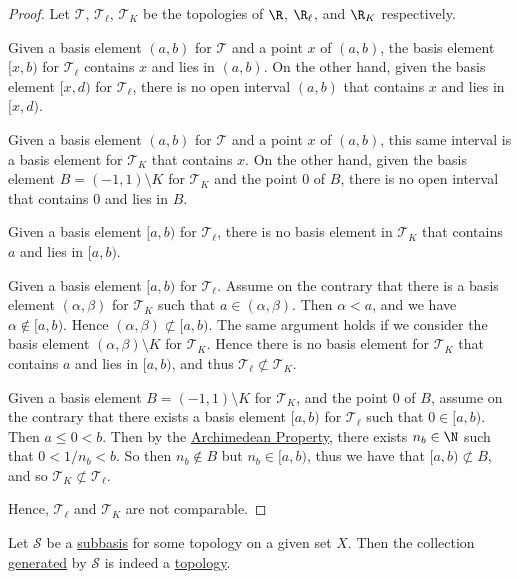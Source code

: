 \begin{proof}
  \def\T{\mathcal T}\def\Tl{\mathcal T_\ell}\def\TK{\mathcal T_K}

  Let $\T$, $\Tl$, $\TK$ be the topologies of $\R$, $\R_\ell$, and $\R_K$
  respectively.

  \proofp{$\T\subsetneq\Tl$} Given a basis element $(a,b)$ for $\T$ and a point
  $x$ of $(a,b)$, the basis element $[x,b)$ for $\Tl$ contains $x$ and lies in
  $(a,b)$. On the other hand, given the basis element $[x,d)$ for $\Tl$, there
  is no open interval $(a,b)$ that contains $x$ and lies in $[x,d)$.

  \proofp{$\T\subsetneq\TK$} Given a basis element $(a,b)$ for $\T$ and a point
  $x$ of $(a,b)$, this same interval is a basis element for $\TK$ that contains
  $x$. On the other hand, given the basis element $B=(-1,1)\setminus K$ for
  $\TK$ and the point $0$ of $B$, there is no open interval that contains $0$
  and lies in $B$.

  \proofp{$\Tl$ and $\TK$ are not comparable} Given a basis element $[a,b)$ for
  $\Tl$, there is no basis element in $\TK$ that contains $a$ and lies in
  $[a,b)$.

  Given a basis element $[a,b)$ for $\Tl$. Assume on the contrary that there is
  a basis element $(\alpha,\beta)$ for $\TK$ such that $a\in(\alpha,\beta)$.
  Then $\alpha<a$, and we have $\alpha\notin[a,b)$. Hence
  $(\alpha,\beta)\not\subset[a,b)$. The same argument holds if we consider the
  basis element $(\alpha,\beta)\setminus K$ for $\TK$. Hence there is no basis
  element for $\TK$ that contains $a$ and lies in $[a,b)$, and thus
  $\Tl\not\subset\TK$.

  Given a basis element $B=(-1,1)\setminus K$ for $\TK$, and the point $0$ of
  $B$, assume on the contrary that there exists a basis element $[a,b)$ for
  $\Tl$ such that $0\in[a,b)$. Then $a\leq0<b$. Then by the
  \href{d845856}{Archimedean Property}, there exists $n_b\in\N$ such that
  $0<1/n_b<b$. So then $n_b\notin B$ but $n_b\in[a,b)$, thus we have that
  $[a,b)\not\subset B$, and so $\TK\not\subset\Tl$.

  Hence, $\Tl$ and $\TK$ are not comparable.
\end{proof}

\label{dc96413}

Let $\mathcal S$ be a \href{aba7b48}{subbasis} for some topology on a given set
$X$. Then the collection \href{d1d3329}{generated} by $\mathcal S$ is indeed a
\href{cc8eb8b}{topology}.

